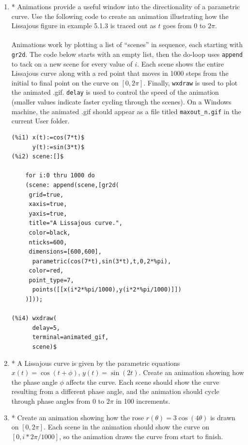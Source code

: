 \documentclass[10.5pt,twoside]{report}
\theoremstyle{definition}
\begin{document}
\begin{enumerate}
\item * Animations provide a useful window into the directionality of a parametric curve.  Use the following code to create an animation illustrating how the Lissajous figure in example 5.1.3 is traced out as $t$ goes from $0$ to $2\pi$. \\

${}$\\

Animations work by plotting a list of ``scenes'' in sequence, each starting with \verb|gr2d|.  The code below starts with an empty list, then the do-loop uses \verb|append| to tack on a new scene for every value of $i$.  Each scene shows the entire Lissajous curve along with a red point that moves in 1000 steps from the initial to final point on the curve on $[0,2\pi]$.  Finally, \verb|wxdraw| is used to plot the animated .gif.  \verb|delay| is used to control the speed of the animation (smaller values indicate faster cycling through the scenes).  On a Windows machine, the animated .gif should appear as a file titled \verb|maxout_n.gif| in the current User folder.


\begin{verbatim}
(%i1) x(t):=cos(7*t)$
      y(t):=sin(3*t)$
(%i2) scene:[]$

    for i:0 thru 1000 do
    (scene: append(scene,[gr2d(
     grid=true,
     xaxis=true,
     yaxis=true,
     title="A Lissajous curve.",
     color=black,
     nticks=600,
     dimensions=[600,600],
      parametric(cos(7*t),sin(3*t),t,0,2*%pi),
     color=red,
     point_type=7,
      points([[x(i*2*%pi/1000),y(i*2*%pi/1000)]])
    )]));
    
(%i4) wxdraw(
      delay=5,
      terminal=animated_gif,
      scene)$
\end{verbatim}


\item *  A Lissajous curve is given by the parametric equations $x(t)=\cos({t+\phi})$, $y(t)=\sin({2t})$.  Create an animation showing how the phase angle $\phi$ affects the curve.  Each scene should show the curve resulting from a different phase angle, and the animation should cycle through phase angles from $0$ to $2\pi$ in 100 increments.

\item * Create an animation showing how the rose $r(\theta)=3\cos{(4\theta)}$ is drawn on $[0,2\pi]$.  Each scene in the animation should show the curve on $[0,i*2\pi / 1000]$, so the animation draws the curve from start to finish.




\end{enumerate}
\end{document}
